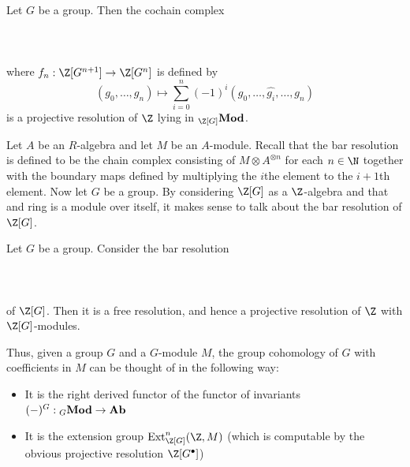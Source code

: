 \documentclass[a4paper]{article}
\begin{document}
\begin{lmm}{}{} Let $G$ be a group. Then the cochain complex \\~\\
\\~\\ where $f_n:\Z[G^{n+1}]\to\Z[G^n]$ is defined by $$(g_0,\dots,g_n)\mapsto\sum_{i=0}^n(-1)^i(g_0,\dots,\hat{g_i},\dots,g_n)$$ is a projective resolution of $\Z$ lying in ${_{\Z[G]}}\bold{Mod}$. 
\end{lmm}

Let $A$ be an $R$-algebra and let $M$ be an $A$-module. Recall that the bar resolution is defined to be the chain complex consisting of $M\otimes A^{\otimes n}$ for each $n\in\N$ together with the boundary maps defined by multiplying the $i$the element to the $i+1$th element. Now let $G$ be a group. By considering $\Z[G]$ as a $\Z$-algebra and that and ring is a module over itself, it makes sense to talk about the bar resolution of $\Z[G]$. 

\begin{prp}{}{} Let $G$ be a group. Consider the bar resolution \\~\\
\\~\\
of $\Z[G]$. Then it is a free resolution, and hence a projective resolution of $\Z$ with $\Z[G]$-modules. 
\end{prp}

Thus, given a group $G$ and a $G$-module $M$, the group cohomology of $G$ with coefficients in $M$ can be thought of in the following way: 
\begin{itemize}
\item It is the right derived functor of the functor of invariants $(-)^G:{_G\bold{Mod}}\to\bold{Ab}$
\item It is the extension group $\text{Ext}_{\Z[G]}^n(\Z,M)$ (which is computable by the obvious projective resolution $\Z[G^\bullet]$)
\end{itemize}
\end{document}
